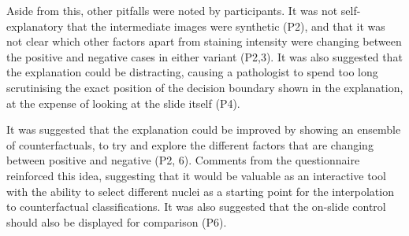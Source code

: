 
Aside from this, other pitfalls were noted by participants. It was not self-explanatory that the intermediate images were synthetic (P2), and that it was not clear which other factors apart from staining intensity were changing between the positive and negative cases in either variant (P2,3). It was also suggested that the explanation could be distracting, causing a pathologist to spend too long scrutinising the exact position of the decision boundary shown in the explanation, at the expense of looking at the slide itself (P4).



It was suggested that the explanation could be improved by showing an ensemble of counterfactuals, to try and explore the different factors that are changing between positive and negative (P2, 6). Comments from the questionnaire reinforced this idea, suggesting that it would be valuable as an interactive tool with the ability to select different nuclei as a starting point for the interpolation to counterfactual classifications. It was also suggested that the on-slide control should also be displayed for comparison (P6).

